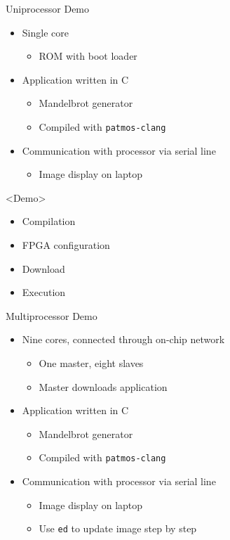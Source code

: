 \documentclass[17pt]{beamer}
\begin{document}
\begin{frame}{Uniprocessor Demo}
  \begin{itemize}
  \item Single core
    \begin{itemize}
    \item ROM with boot loader
    \end{itemize}
  \item Application written in C
    \begin{itemize}
    \item Mandelbrot generator
    \item Compiled with \texttt{patmos-clang}
    \end{itemize}
  \item Communication with processor via serial line
    \begin{itemize}
    \item Image display on laptop
    \end{itemize}
  \end{itemize}
\end{frame}

\begin{frame}{<Demo>}
  \begin{itemize}
  \item Compilation
  \item FPGA configuration
  \item Download
  \item Execution
  \end{itemize}
\end{frame}

\begin{frame}{Multiprocessor Demo}
  \begin{itemize}
  \item Nine cores, connected through on-chip network
    \begin{itemize}
    \item One master, eight slaves
    \item Master downloads application
    \end{itemize}
  \item Application written in C
    \begin{itemize}
    \item Mandelbrot generator
    \item Compiled with \texttt{patmos-clang}
    \end{itemize}
  \item Communication with processor via serial line
    \begin{itemize}
    \item Image display on laptop
    \item Use \texttt{ed} to update image step by step
    \end{itemize}
  \end{itemize}
\end{frame}
\end{document}
